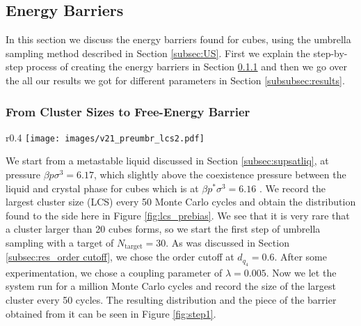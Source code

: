 \documentclass[thesis]{subfiles}
\begin{document}
\subsection{Energy Barriers}\label{subsec:E bar}

In this section we discuss the energy barriers found for cubes, using the umbrella sampling method described in Section \ref{subsec:US}. First we explain the step-by-step process of creating the energy barriers in Section \ref{subsubsec:stepbystep} and then we go over the all our results we got for different parameters in Section \ref{subsubsec:results}.

\subsubsection{From Cluster Sizes to Free-Energy Barrier} \label{subsubsec:stepbystep}

\begin{wrapfigure}{r}{0.4\textwidth}
	\centering
	\vspace{-20pt}
	\texttt{[image: images/v21\_preumbr\_lcs2.pdf]}
	\caption{A log plot of the LCS distribution.}\label{fig:lcs_prebias}
	\vspace{-15pt}
\end{wrapfigure}

We start from a metastable liquid discussed in Section \ref{subsec:supsatliq}, at pressure $\beta p \sigma^3 = 6.17$, which slightly above the coexistence pressure between the liquid and crystal phase for cubes which is at $\beta p^* \sigma^3 = 6.16$ \cite{smallenburg2012vacancy}. We record the largest cluster size (LCS) every 50 Monte Carlo cycles and obtain the distribution found to the side here in Figure \ref{fig:lcs_prebias}. We see that it is very rare that a cluster larger than 20 cubes forms, so we start the first step of umbrella sampling with a target of $N_\textrm{target} = 30$. As was discussed in Section \ref{subsec:res_order cutoff}, we chose the order cutoff at $d_{q_4} = 0.6$. After some experimentation, we chose a coupling parameter of $\lambda = 0.005$. Now we let the system run for a million Monte Carlo cycles and record the size of the largest cluster every 50 cycles. The resulting distribution and the piece of the barrier obtained from it can be seen in Figure \ref{fig:step1}. 
\end{document}
